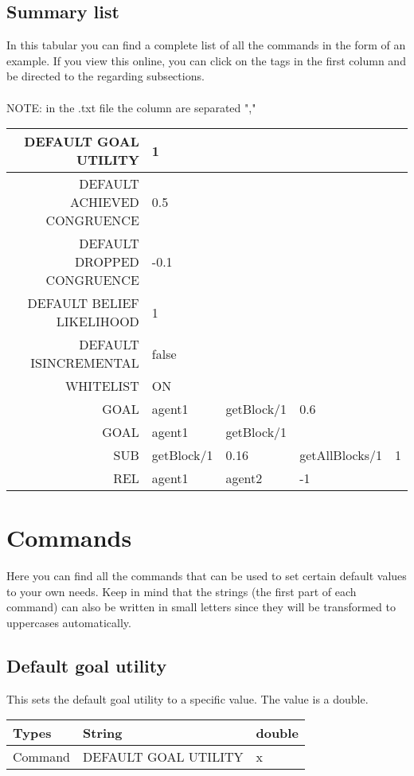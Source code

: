 \documentclass{scrartcl}
\begin{document}
\subsection{Summary list}
In this tabular you can find a complete list of all the commands in the form of an example. If you view this online, you can click on the tags in the first column and be directed to the regarding subsections.\\
\\
NOTE: in the .txt file the column are separated ","\\
\begin{tabular}{|r|l|l|l|l|}
	\hline  DEFAULT GOAL UTILITY & 1 &  &  &  \\ 
	\hline  DEFAULT ACHIEVED CONGRUENCE & 0.5 &  &  &  \\ 
	\hline  DEFAULT DROPPED CONGRUENCE & -0.1 &  &  &  \\ 
	\hline  DEFAULT BELIEF LIKELIHOOD& 1 &  &  &  \\ 
	\hline  DEFAULT ISINCREMENTAL & false &  &  &  \\ 
	\hline  WHITELIST & ON &  &  &  \\ 
	\hline  GOAL &  agent1 &  getBlock/1 &  0.6 &  \\ 
	\hline  GOAL &  agent1 &  getBlock/1 &  &  \\ 
	\hline  SUB& getBlock/1 & 0.16 & getAllBlocks/1 & 1 \\ 
	\hline  REL &  agent1&  agent2 & -1 &  \\
	\hline  
\end{tabular}


\section{Commands}
Here you can find all the commands that can be used to set certain default values to your own needs. Keep in mind that the strings (the first part of each command) can also be written in small letters since they will be transformed to uppercases automatically. 

\subsection{Default goal utility}
This sets the default goal utility to a specific value. The value is a double.\\
\begin{tabular}{|l|l|l|}
	\hline  Types & String & double  \\ 
	\hline  Command & DEFAULT GOAL UTILITY & x  \\ 
	\hline 
\end{tabular}
\\
\end{document}
